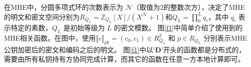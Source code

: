 在MHE中，分圆多项式环的次数表示为 $\mathcal{N}$（取值为2的整数次方），决定了MHE的明文和密文空间分别为$R_{Q_{L}}=\mathbb{Z}_{Q_{L}}[X]/(X^{\mathcal{N}}+1)$和$Q_{L}=\prod_{0}^{L}q_i$，其中 $q_i$ 表示特定的素数，$Q_L$ 是初始等级为 $L$ 的密文模数。
图\ref{f1}中简单介绍了使用到的MHE相关函数。在图中，使用$\llbracket c\rrbracket_{pk}=(c_0,c_1)\in R^2_{Q_{L}}$ 和 $\overline{p}\in R_{Q_{L}}$ 分别表示MHE公钥加密后的密文和编码之后的明文。
图\ref{f1}中以$‘\textbf{D}’$开头的函数都是分布式的，需要由所有私钥持有方协同完成计算，而其它的函数在任意一方本地计算即可。


